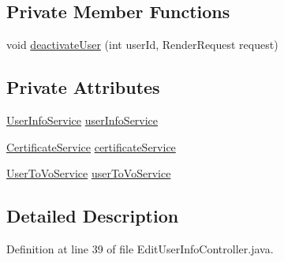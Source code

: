 \subsection*{Private Member Functions}
\begin{DoxyCompactItemize}
\item 
void \hyperlink{classportal_1_1registration_1_1controller_1_1EditUserInfoController_a9d4f65b993d3f9b6f978bcaa7c51aede}{deactivateUser} (int userId, RenderRequest request)
\end{DoxyCompactItemize}
\subsection*{Private Attributes}
\begin{DoxyCompactItemize}
\item 
\hyperlink{interfaceportal_1_1registration_1_1services_1_1UserInfoService}{UserInfoService} \hyperlink{classportal_1_1registration_1_1controller_1_1EditUserInfoController_a92a1c1746c66dbf600394d8b042acc65}{userInfoService}
\item 
\hyperlink{interfaceportal_1_1registration_1_1services_1_1CertificateService}{CertificateService} \hyperlink{classportal_1_1registration_1_1controller_1_1EditUserInfoController_ad152ea56d1ec9c7cb1f0f79d0a6008c4}{certificateService}
\item 
\hyperlink{interfaceportal_1_1registration_1_1services_1_1UserToVoService}{UserToVoService} \hyperlink{classportal_1_1registration_1_1controller_1_1EditUserInfoController_a5b22c5c2153cf26ed9ce7c515b29af04}{userToVoService}
\end{DoxyCompactItemize}


\subsection{Detailed Description}


Definition at line 39 of file EditUserInfoController.java.



